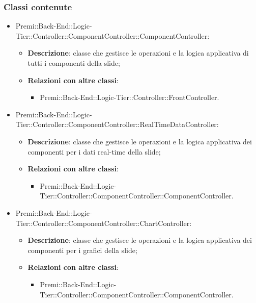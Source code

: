 	\subsubsection*{Classi contenute}
	\begin{itemize}
		\item Premi::Back-End::Logic-Tier::Controller::ComponentController::ComponentController:
		\begin{itemize}
			\item \textbf{Descrizione}: classe che gestisce le operazioni e la logica applicativa di tutti i componenti della slide;
			\item \textbf{Relazioni con altre classi}:
			\begin{itemize}
				\item Premi::Back-End::Logic-Tier::Controller::FrontController.
			\end{itemize}
		\end{itemize}
		
		\item Premi::Back-End::Logic-Tier::Controller::ComponentController::RealTimeDataController:
		\begin{itemize}
			\item \textbf{Descrizione}: classe che gestisce le operazioni e la logica applicativa dei componenti per i dati real-time della slide;
			\item \textbf{Relazioni con altre classi}:
			\begin{itemize}
				\item Premi::Back-End::Logic-Tier::Controller::ComponentController::ComponentController.
			\end{itemize}
		\end{itemize}
		
		\item Premi::Back-End::Logic-Tier::Controller::ComponentController::ChartController:
		\begin{itemize}
			\item \textbf{Descrizione}: classe che gestisce le operazioni e la logica applicativa dei componenti per i grafici della slide;
			\item \textbf{Relazioni con altre classi}:
			\begin{itemize}
				\item Premi::Back-End::Logic-Tier::Controller::ComponentController::ComponentController.
			\end{itemize}
		\end{itemize}
		

\end{itemize}
